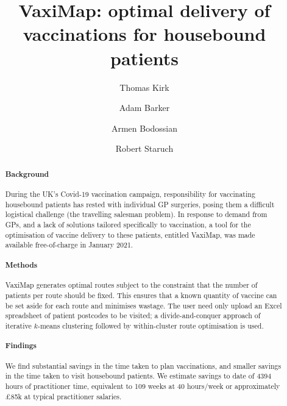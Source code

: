 \documentclass[review]{elsarticle}
\def\vm{VaxiMap}
\begin{document}
\begin{frontmatter}

\title{\vm{}{}: optimal delivery of vaccinations for housebound patients}


\address[IBME]{Institute of Biomedical Engineering, Department of Engineering Science, University of Oxford}

\address[Sqpt]{Squarepoint Capital LLP, London}
\address[Vod]{Vodafone Group PLC, London}

\author[IBME]{Thomas Kirk}

\author[Sqpt]{Adam Barker}
\author[Vod]{Armen Bodossian}
\author[IBME]{Robert Staruch}

\begin{abstract}
\paragraph{Background} During the UK's Covid-19 vaccination campaign, responsibility for vaccinating housebound patients has rested with individual GP surgeries, posing them a difficult logistical challenge (the travelling salesman problem). In response to demand from GPs, and a lack of solutions tailored specifically to vaccination, a tool for the optimisation of vaccine delivery to these patients, entitled \vm{}, was made available free-of-charge in January 2021. 

\paragraph{Methods} \vm{} generates optimal routes subject to the constraint that the number of patients per route should be fixed. This ensures that a known quantity of vaccine can be set aside for each route and minimises wastage. The user need only upload an Excel spreadsheet of patient postcodes to be visited; a divide-and-conquer approach of iterative $k$-means clustering followed by within-cluster route optimisation is used. 

\paragraph{Findings} We find substantial savings in the time taken to plan vaccinations, and smaller savings in the time taken to visit housebound patients. We estimate savings to date of 4394 hours of practitioner time, equivalent to 109 weeks at 40 hours/week or approximately £85k at typical practitioner salaries. 


\end{abstract}
\end{frontmatter}
\end{document}
